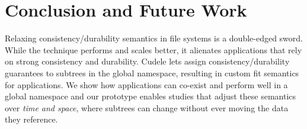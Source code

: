 %
%
%
%
%
%
%

\section{Conclusion and Future Work}

Relaxing consistency/durability semantics in file systems is a double-edged
sword. While the technique performs and scales better, it alienates applications that rely
on strong consistency and durability.  Cudele lets
 assign consistency/durability
guarantees to subtrees in the global namespace, resulting in 
custom fit semantics for applications. We show how applications can co-exist and
perform well in a global namespace and our prototype enables studies that
adjust these semantics over {\it time and space}, where subtrees can change
without ever moving the data they reference.

